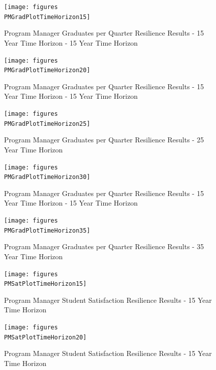 \begin{figure}[h]
  \centering\texttt{[image: figures\\PMGradPlotTimeHorizon15]}
  \caption{Program Manager Graduates per Quarter Resilience Results - 15 Year Time Horizon - 15 Year Time Horizon}
  \label{f:PMresultsGrad15}
\end{figure}

\begin{figure}[h]
  \centering\texttt{[image: figures\\PMGradPlotTimeHorizon20]}
  \caption{Program Manager Graduates per Quarter Resilience Results - 15 Year Time Horizon - 15 Year Time Horizon}
  \label{f:PMresultsGrad20}
\end{figure}


\begin{figure}[h]
  \centering\texttt{[image: figures\\PMGradPlotTimeHorizon25]}
  \caption{Program Manager Graduates per Quarter Resilience Results - 25 Year Time Horizon}
  \label{f:PMresultsGrad25}
\end{figure}

\begin{figure}[h]
  \centering\texttt{[image: figures\\PMGradPlotTimeHorizon30]}
  \caption{Program Manager Graduates per Quarter Resilience Results - 15 Year Time Horizon - 15 Year Time Horizon}
  \label{f:PMresultsGrad30}
\end{figure}


\begin{figure}[h]
  \centering\texttt{[image: figures\\PMGradPlotTimeHorizon35]}
  \caption{Program Manager Graduates per Quarter Resilience Results - 35 Year Time Horizon}
  \label{f:PMresultsGrad35}
\end{figure}

\begin{figure}[h]
  \centering\texttt{[image: figures\\PMSatPlotTimeHorizon15]}
  \caption{Program Manager Student Satisfaction Resilience Results - 15 Year Time Horizon}
  \label{f:PMresultsSat15}
\end{figure}

\begin{figure}[h]
  \centering\texttt{[image: figures\\PMSatPlotTimeHorizon20]}
  \caption{Program Manager Student Satisfaction Resilience Results - 15 Year Time Horizon}
  \label{f:PMresultsSat20}
\end{figure}

